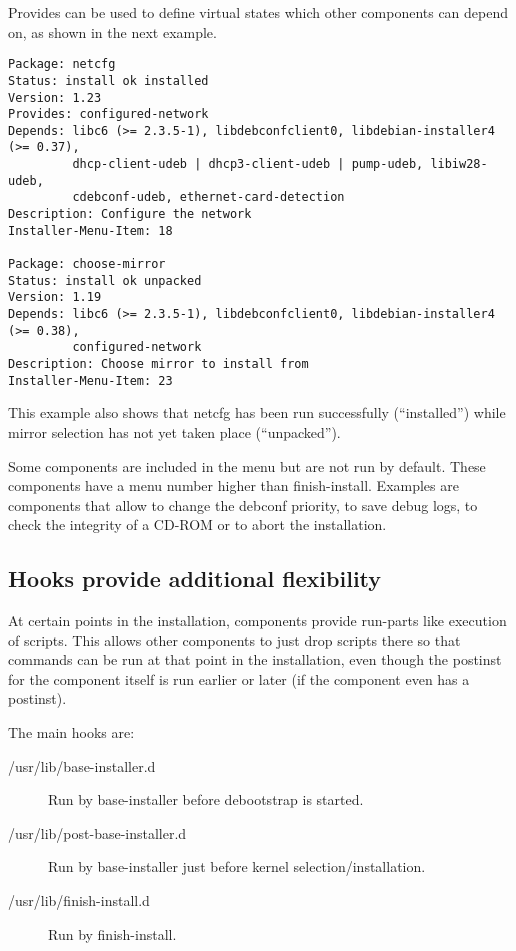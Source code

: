 \documentclass[a4paper,10pt]{article}
\begin{document}
Provides can be used to define virtual states which other components can depend on, as shown in the next example. 

\begin{verbatim}
Package: netcfg
Status: install ok installed
Version: 1.23
Provides: configured-network
Depends: libc6 (>= 2.3.5-1), libdebconfclient0, libdebian-installer4 (>= 0.37),
         dhcp-client-udeb | dhcp3-client-udeb | pump-udeb, libiw28-udeb,
         cdebconf-udeb, ethernet-card-detection
Description: Configure the network
Installer-Menu-Item: 18

Package: choose-mirror
Status: install ok unpacked
Version: 1.19
Depends: libc6 (>= 2.3.5-1), libdebconfclient0, libdebian-installer4 (>= 0.38),
         configured-network
Description: Choose mirror to install from
Installer-Menu-Item: 23
\end{verbatim}

This example also shows that netcfg has been run successfully (“installed”) while mirror selection has not yet taken place (“unpacked”). 

Some components are included in the menu but are not run by default. These components have a menu number higher than finish-install. Examples are components that allow to change the debconf priority, to save debug logs, to check the integrity of a CD-ROM or to abort the installation. 


\subsection{Hooks provide additional flexibility}
At certain points in the installation, components provide run-parts like execution of scripts. This allows other components to just drop scripts there so that commands can be run at that point in the installation, even though the postinst for the component itself is run earlier or later (if the component even has a postinst). 

The main hooks are: 

\begin{description}
\item[/usr/lib/base-installer.d] Run by base-installer before debootstrap is started.
\item[/usr/lib/post-base-installer.d] Run by base-installer just before kernel selection/installation.
\item[/usr/lib/finish-install.d] Run by finish-install. 
\end{description}
\end{document}
